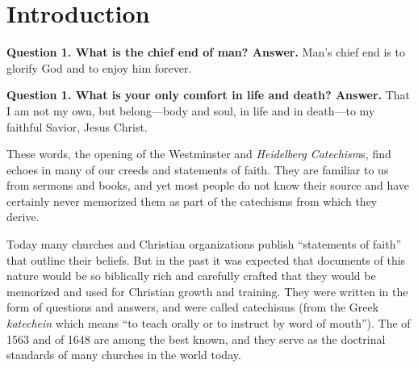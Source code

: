 \documentclass[titlepage]{memoir}
\begin{document}
\tableofcontents

\cleardoublepage

\pagestyle{myPageStyle}

\mainmatter

\chapter{Introduction}

\hspace{3ex}\textbf{Question 1. What is the chief end of man?\newline
Answer.} Man's chief end is to glorify God and to enjoy him forever.

\textbf{Question 1. What is your only comfort in life and death?\newline
Answer.} That I am not my own, but belong\thinspace{}---\thinspace{}body and soul, in life and in death\thinspace{}---\thinspace{}to my faithful Savior, Jesus Christ.

\smallskip

These words, the opening of the Westminster and {\em Heidelberg Catechism}s, find echoes in many of our creeds and statements of faith. They are familiar to us from sermons and books, and yet most people do not know their source and have certainly never memorized them as part of the catechisms from which they derive.

Today many churches and Christian organizations publish ``statements of faith'' that outline their beliefs. But in the past it was expected that documents of this nature would be so biblically rich and carefully crafted that they would be memorized and used for Christian growth and training. They were written in the form of questions and answers, and were called catechisms (from the Greek {\em katechein}\/ which means ``to teach orally or to instruct by word of mouth''). The \/ of 1563 and \/ of 1648 are among the best known, and they serve as the doctrinal standards of many churches in the world today.
\end{document}
